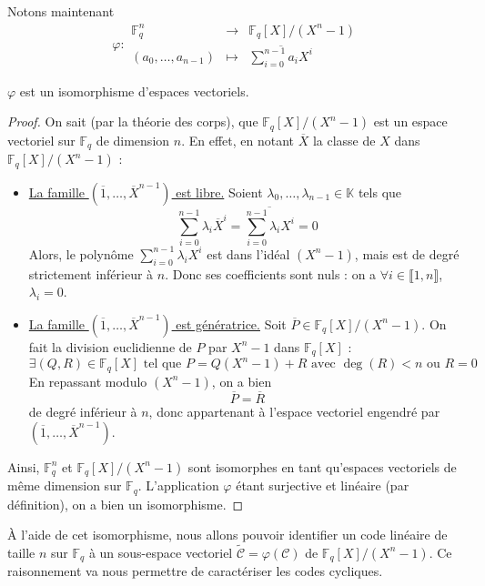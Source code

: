   Notons maintenant
  \[
    \varphi :
    \begin{array}{ccc}
      \mathbb{F}_q^n &\rightarrow& \mathbb{F}_q[X]/(X^n-1) \\
      (a_0, \dots, a_{n-1}) &\mapsto& \overline{\sum_{i=0}^{n-1} a_i X^i}
    \end{array}
  \]

  \begin{lemma}
    $\varphi$ est un isomorphisme d'espaces vectoriels.
  \end{lemma}

  \begin{proof}
    On sait (par la théorie des corps), que $\mathbb{F}_q[X]/(X^n-1)$ est un espace vectoriel sur $\mathbb{F}_q$ de dimension $n$. En effet, en notant $\overline{X}$ la classe de $X$ dans $\mathbb{F}_q[X]/(X^n-1)$ :
    \begin{itemize}
      \item \uline{La famille $(\overline{1}, \dots, \overline{X}^{n-1})$ est libre.} Soient $\lambda_0, \dots, \lambda_{n-1} \in \mathbb{K}$ tels que
      \[ \sum_{i=0}^{n-1} \lambda_i \overline{X}^i = \overline{\sum_{i=0}^{n-1} \lambda_i X^i} = 0 \]
      Alors, le polynôme $\sum_{i=0}^{n-1} \lambda_i X^i$ est dans l'idéal $(X^n-1)$, mais est de degré strictement inférieur à $n$. Donc ses coefficients sont nuls : on a $\forall i \in \llbracket 1, n \rrbracket$, $\lambda_i = 0$.
      \item \uline{La famille $(\overline{1}, \dots, \overline{X}^{n-1})$ est génératrice.} Soit $\overline{P} \in \mathbb{F}_q[X]/(X^n-1)$. On fait la division euclidienne de $P$ par $X^n - 1$ dans $\mathbb{F}_q[X]$ :
      \[ \exists (Q,R) \in \mathbb{F}_q[X] \text{ tel que } P = Q(X^n-1) + R \text{ avec } \deg(R) < n \text{ ou } R = 0 \]
      En repassant modulo $(X^n - 1)$, on a bien
      \[ \overline{P} = \overline{R} \]
      de degré inférieur à $n$, donc appartenant à l'espace vectoriel engendré par $(\overline{1}, \dots, \overline{X}^{n-1})$.
    \end{itemize}
    Ainsi, $\mathbb{F}_q^n$ et $\mathbb{F}_q[X]/(X^n-1)$ sont isomorphes en tant qu'espaces vectoriels de même dimension sur $\mathbb{F}_q$. L'application $\varphi$ étant surjective et linéaire (par définition), on a bien un isomorphisme.
  \end{proof}

  À l'aide de cet isomorphisme, nous allons pouvoir identifier un code linéaire de taille $n$ sur $\mathbb{F}_q$ à un sous-espace vectoriel $\widetilde{\mathcal{C}} = \varphi(\mathcal{C})$ de $\mathbb{F}_q[X]/(X^n-1)$. Ce raisonnement va nous permettre de caractériser les codes cycliques.

